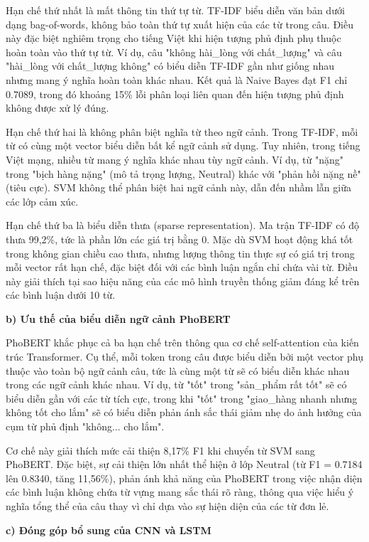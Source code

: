 \documentclass[14pt, a4paper]{report}
\begin{document}
Hạn chế thứ nhất là mất thông tin thứ tự từ. TF-IDF biểu diễn văn bản dưới dạng bag-of-words, không bảo toàn thứ tự xuất hiện của các từ trong câu. Điều này đặc biệt nghiêm trọng cho tiếng Việt khi hiện tượng phủ định phụ thuộc hoàn toàn vào thứ tự từ. Ví dụ, câu "không hài\_lòng với chất\_lượng" và câu "hài\_lòng với chất\_lượng không" có biểu diễn TF-IDF gần như giống nhau nhưng mang ý nghĩa hoàn toàn khác nhau. Kết quả là Naive Bayes đạt F1 chỉ 0.7089, trong đó khoảng 15\% lỗi phân loại liên quan đến hiện tượng phủ định không được xử lý đúng.


Hạn chế thứ hai là không phân biệt nghĩa từ theo ngữ cảnh. Trong TF-IDF, mỗi từ có cùng một vector biểu diễn bất kể ngữ cảnh sử dụng. Tuy nhiên, trong tiếng Việt mạng, nhiều từ mang ý nghĩa khác nhau tùy ngữ cảnh. Ví dụ, từ "nặng" trong "bịch hàng nặng" (mô tả trọng lượng, Neutral) khác với "phản hồi nặng nề" (tiêu cực). SVM không thể phân biệt hai ngữ cảnh này, dẫn đến nhầm lẫn giữa các lớp cảm xúc.


Hạn chế thứ ba là biểu diễn thưa (sparse representation). Ma trận TF-IDF có độ thưa 99,2\%, tức là phần lớn các giá trị bằng 0. Mặc dù SVM hoạt động khá tốt trong không gian chiều cao thưa, nhưng lượng thông tin thực sự có giá trị trong mỗi vector rất hạn chế, đặc biệt đối với các bình luận ngắn chỉ chứa vài từ. Điều này giải thích tại sao hiệu năng của các mô hình truyền thống giảm đáng kể trên các bình luận dưới 10 từ.


\textbf{b) Ưu thế của biểu diễn ngữ cảnh PhoBERT}


PhoBERT khắc phục cả ba hạn chế trên thông qua cơ chế self-attention của kiến trúc Transformer. Cụ thể, mỗi token trong câu được biểu diễn bởi một vector phụ thuộc vào toàn bộ ngữ cảnh câu, tức là cùng một từ sẽ có biểu diễn khác nhau trong các ngữ cảnh khác nhau. Ví dụ, từ "tốt" trong "sản\_phẩm rất tốt" sẽ có biểu diễn gần với các từ tích cực, trong khi "tốt" trong "giao\_hàng nhanh nhưng không tốt cho lắm" sẽ có biểu diễn phản ánh sắc thái giảm nhẹ do ảnh hưởng của cụm từ phủ định "không... cho lắm".


Cơ chế này giải thích mức cải thiện 8,17\% F1 khi chuyển từ SVM sang PhoBERT. Đặc biệt, sự cải thiện lớn nhất thể hiện ở lớp Neutral (từ F1 = 0.7184 lên 0.8340, tăng 11,56\%), phản ánh khả năng của PhoBERT trong việc nhận diện các bình luận không chứa từ vựng mang sắc thái rõ ràng, thông qua việc hiểu ý nghĩa tổng thể của câu thay vì chỉ dựa vào sự hiện diện của các từ đơn lẻ.


\textbf{c) Đóng góp bổ sung của CNN và LSTM}
\end{document}

